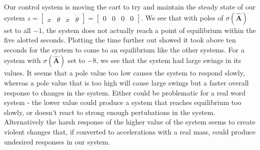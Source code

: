 \documentclass{article}
\begin{document}
Our control system is moving the cart to try and maintain the steady state of our system $z=\begin{bmatrix}x & \theta & \dot{x} & \dot{\theta} \end{bmatrix}=\begin{bmatrix} 0 & 0 & 0 & 0 \end{bmatrix}$. We see that with poles of $\sigma(\hat{\boldsymbol{A}})$ set to all $-1$, the system does not actually reach a point of equilibrium within the five alotted seconds. Plotting the time further out showed it took above ten seconds for the system to come to an equilibrium like the other systems. For a system with $\sigma(\hat{\boldsymbol{A}})$ set to $-8$, we see that the system had large swings in its values. It seems that a pole value too low causes the system to respond slowly, whereas a pole value that is too high will cause large swings but a faster overall response to changes in the system. Either could be problematic for a real word system - the lower value could produce a system that reaches equilibrium too slowly, or doesn't react to strong enough pertubations in the system. Alternatively the harsh response of the higher value of the system seems to create violent changes that, if converted to accelerations with a real mass, could produce undesired responses in our system.
\end{document}
